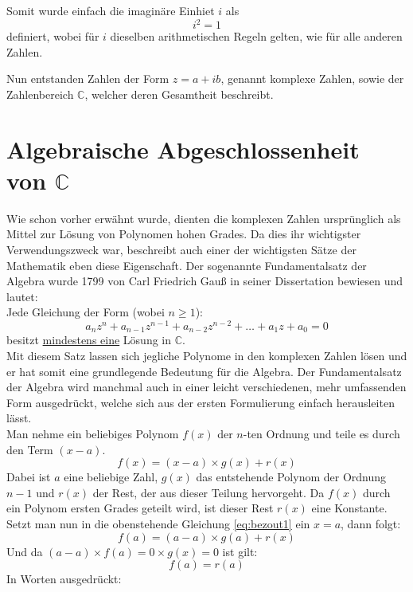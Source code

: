 \documentclass[a4paper,12pt]{article} %
\begin{document}
Somit wurde einfach die imaginäre Einhiet $i$ als
\[i^2=1\]
definiert, wobei für $i$ dieselben arithmetischen Regeln gelten, wie für alle anderen Zahlen.

Nun entstanden Zahlen der Form $z=a+ib$, genannt komplexe Zahlen, sowie der Zahlenbereich $\mathbb{C}$, welcher deren Gesamtheit beschreibt.






\section{Algebraische Abgeschlossenheit von $\mathbb{C}$}

Wie schon vorher erwähnt wurde, dienten die komplexen Zahlen ursprünglich als Mittel zur Lösung von Polynomen hohen Grades.
Da dies ihr wichtigster Verwendungszweck war, beschreibt auch einer der wichtigsten Sätze der Mathematik eben diese Eigenschaft.
Der sogenannte Fundamentalsatz der Algebra wurde 1799 von Carl Friedrich Gauß in seiner Dissertation bewiesen und lautet:\\


\noindent Jede Gleichung der Form (wobei $n \geq 1 $):
\begin{equation}\label{eq:funda}
\boxed{
a_nz^n + a_{n-1}z^{n-1} + a_{n-2}z^{n-2} + \dots + a_1z + a_0 = 0
}
\end{equation} 
besitzt \underline{mindestens eine} Lösung in $\mathbb{C}$.\\



Mit diesem Satz lassen sich jegliche Polynome in den komplexen Zahlen lösen und er hat somit eine grundlegende Bedeutung für die Algebra.
Der Fundamentalsatz der Algebra wird manchmal auch in einer leicht verschiedenen, mehr umfassenden Form ausgedrückt, welche sich aus der ersten Formulierung einfach herausleiten lässt.\\

\noindent Man nehme ein beliebiges Polynom $f(x)$ der $n$-ten Ordnung und teile es durch den Term $(x-a)$.
\begin{equation}\label{eq:bezout1}
f(x) = (x - a) \times g(x) + r(x)
\end{equation} 
Dabei ist $a$ eine beliebige Zahl, $g(x)$ das entstehende Polynom der Ordnung $n-1$ und $r(x)$ der Rest, der aus dieser Teilung hervorgeht.
Da $f(x)$ durch ein Polynom ersten Grades geteilt wird, ist dieser Rest $r(x)$ eine Konstante.
Setzt man nun in die obenstehende Gleichung \eqref{eq:bezout1} ein $x=a$, dann folgt:
\[ f(a) = (a-a) \times g(a) + r(x) \]
Und da $(a - a) \times f(a) = 0 \times g(x) = 0 $ ist gilt:
\[ f(a) = r(a) \]
In Worten ausgedrückt:
\end{document}
